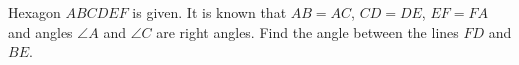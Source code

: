 Hexagon $ABCDEF$ is given. It is known that $AB=AC$, $CD=DE$, $EF=FA$ and angles $\angle A$ and $\angle C$ are right angles. Find the angle between the lines $FD$ and $BE$. 